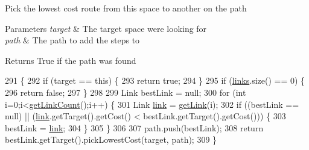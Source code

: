 Pick the lowest cost route from this space to another on the path


\begin{DoxyParams}{Parameters}
{\em target} & The target space we\textquotesingle{}re looking for \\
\hline
{\em path} & The path to add the steps to \\
\hline
\end{DoxyParams}
\begin{DoxyReturn}{Returns}
True if the path was found 
\end{DoxyReturn}

\begin{DoxyCode}
291                                                               \{
292         \textcolor{keywordflow}{if} (target == \textcolor{keyword}{this}) \{
293             \textcolor{keywordflow}{return} \textcolor{keyword}{true};
294         \}
295         \textcolor{keywordflow}{if} (\mbox{\hyperlink{classorg_1_1newdawn_1_1slick_1_1util_1_1pathfinding_1_1navmesh_1_1_space_aa9edbad1ad11ced12f9a5a5b73b50a9f}{links}}.size() == 0) \{
296             \textcolor{keywordflow}{return} \textcolor{keyword}{false};
297         \}
298 
299         Link bestLink = null;   
300         \textcolor{keywordflow}{for} (\textcolor{keywordtype}{int} i=0;i<\mbox{\hyperlink{classorg_1_1newdawn_1_1slick_1_1util_1_1pathfinding_1_1navmesh_1_1_space_acbf12c4dedd1bd281287e4c195bf3a88}{getLinkCount}}();i++) \{
301             Link \mbox{\hyperlink{classorg_1_1newdawn_1_1slick_1_1util_1_1pathfinding_1_1navmesh_1_1_space_aef276d96a286583f4d5bdb55a051ddb5}{link}} = \mbox{\hyperlink{classorg_1_1newdawn_1_1slick_1_1util_1_1pathfinding_1_1navmesh_1_1_space_a4e59fd2383be245f7188a62b01e602ab}{getLink}}(i);
302             \textcolor{keywordflow}{if} ((bestLink == null) || (\mbox{\hyperlink{classorg_1_1newdawn_1_1slick_1_1util_1_1pathfinding_1_1navmesh_1_1_space_aef276d96a286583f4d5bdb55a051ddb5}{link}}.getTarget().getCost() < bestLink.getTarget().getCost())) \{
303                 bestLink = \mbox{\hyperlink{classorg_1_1newdawn_1_1slick_1_1util_1_1pathfinding_1_1navmesh_1_1_space_aef276d96a286583f4d5bdb55a051ddb5}{link}};
304             \}
305         \}
306         
307         path.push(bestLink);
308         \textcolor{keywordflow}{return} bestLink.getTarget().pickLowestCost(target, path);
309     \}
\end{DoxyCode}
\mbox{\label{classorg_1_1newdawn_1_1slick_1_1util_1_1pathfinding_1_1navmesh_1_1_space_af58590865dc45fa1153cb3c934500c12}} 
